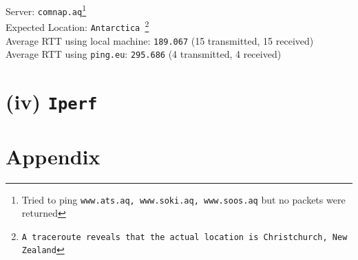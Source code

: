 \documentclass[11pt, fleqn]{article}
\begin{document}
\hrulefill
\smallskip

Server: \texttt{comnap.aq}\footnote{Tried to ping \texttt{www.ats.aq, www.soki.aq, www.soos.aq} but no packets were returned}\\
Expected Location: \texttt{Antarctica \footnote{A \texttt{traceroute} reveals that the actual location is Christchurch, New Zealand}}\\
Average RTT using local machine: \texttt{189.067} (15 transmitted, 15 received)\\
Average RTT using \texttt{ping.eu}: \texttt{295.686} (4 transmitted, 4 received)



\newpage
\section*{(iv) \texttt{Iperf}}
\label{partd}
\setcounter{equation}{0}


\newpage
\section*{Appendix}
\setcounter{equation}{0}
\end{document}
